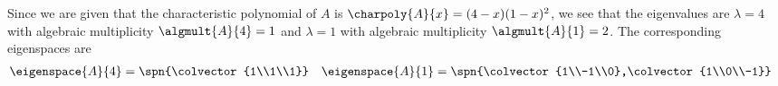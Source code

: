 Since we are given that the characteristic polynomial of $A$ is $\charpoly{A}{x} = (4-x)(1-x)^2$, we see that the eigenvalues are 
$\lambda = 4$ with algebraic multiplicity $\algmult{A}{4} = 1$ and 
$\lambda = 1$ with algebraic multiplicity $\algmult{A}{1} = 2$.   
The corresponding eigenspaces are 
%
\begin{align*}
\eigenspace{A}{4} &= \spn{\colvector{1\\1\\1}}
&
\eigenspace{A}{1} &= \spn{\colvector{1\\-1\\0},\colvector{1\\0\\-1}}
\end{align*}
